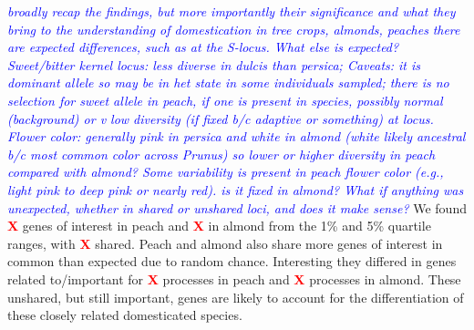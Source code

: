 \documentclass[12pt]{article}
\newcommand{\X}{\textcolor{red}{\bf X }}
\newcommand{\jri}[1]{\textcolor{red}{\emph{#1}}}
\newcommand{\dv}[1]{\textcolor{blue}{\emph{#1}}}
\begin{document}
\dv{broadly recap the findings, but more importantly their significance and what they bring to the understanding of domestication in tree crops, almonds, peaches}
\dv{there are expected differences, such as at the S-locus. What else is expected? Sweet/bitter kernel locus: less diverse in dulcis than persica; Caveats: it is dominant allele so may be in het state in some individuals sampled; there is no selection for sweet allele in peach, if one is present in species, possibly normal (background) or v low diversity (if fixed b/c adaptive or something) at locus. Flower color: generally pink in persica and white in almond (white likely ancestral b/c most common color across Prunus) so lower or higher diversity in peach compared with almond? Some variability is present in peach flower color (e.g., light pink to deep pink or nearly red). is it fixed in almond? What if anything was unexpected, whether in shared or unshared loci, and does it make sense?}
%
We found \X genes of interest in peach and \X in almond from the 1\% and 5\% quartile ranges, with \X shared.
%
Peach and almond also share more genes of interest in common than expected due to random chance.
%
Interesting they differed in genes related to/important for \X processes in peach and \X processes in almond.
%
These unshared, but still important, genes are likely to account for the differentiation of these closely related domesticated species.
\end{document}
